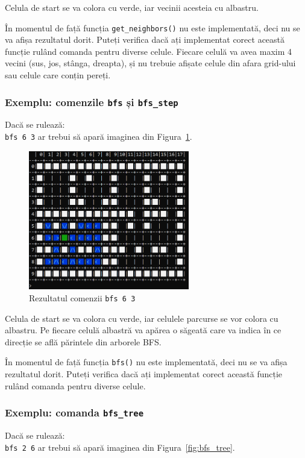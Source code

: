 \documentclass[../ro-fa-lab.tex]{subfiles}
\begin{document}
Celula de start se va colora cu verde, iar vecinii acesteia cu albastru.

În momentul de față funcția \texttt{get\_neighbors()} nu este implementată, deci nu se va afișa rezultatul dorit. Puteți verifica dacă ați implementat corect această funcție rulând comanda pentru diverse celule. Fiecare celulă va avea maxim 4 vecini (sus, jos, stânga, dreapta), și nu trebuie afișate celule din afara grid-ului sau celule care conțin pereți.

\subsubsection{Exemplu: comenzile \texttt{bfs} și \texttt{bfs\_step}}
Dacă se rulează:\\
\texttt{bfs 6 3}
ar trebui să apară imaginea din Figura~\ref{fig:bfs1}.

\begin{figure}[h]
    \centering
    \includegraphics[width=7cm]{../Resources/lab9/grid_bfs1.png}
    \caption{Rezultatul comenzii \texttt{bfs 6 3}}
    \label{fig:bfs1}
\end{figure}

Celula de start se va colora cu verde, iar celulele parcurse se vor colora cu albastru. Pe fiecare celulă albastră va apărea o săgeată care va indica în ce direcție se află părintele din arborele BFS.

În momentul de față funcția \texttt{bfs()} nu este implementată, deci nu se va afișa rezultatul dorit. Puteți verifica dacă ați implementat corect această funcție rulând comanda pentru diverse celule.

\subsubsection{Exemplu: comanda \texttt{bfs\_tree}}
Dacă se rulează:\\
\texttt{bfs 2 6}
ar trebui să apară imaginea din Figura~\ref{fig:bfs_tree}.
\end{document}
